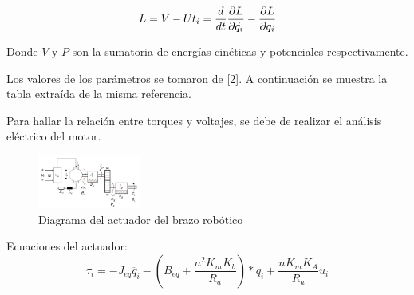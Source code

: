\documentclass[conference]{IEEEtran}
\begin{document}
\begin{equation}
L = V - U
t_i = \frac{d}{dt}\frac{\partial L }{\partial \dot{q_i}} - \frac{\partial L}{\partial q_i}\\
\end{equation}

Donde $V$ y $P$ son la sumatoria de energías cinéticas y potenciales respectivamente.



Los valores de los parámetros se tomaron de [2]. A continuación se muestra la tabla extraída de la misma referencia.


\onecolumn

Para hallar la relación entre torques y voltajes, se debe de realizar el análisis eléctrico del motor.
\begin{figure} [h]
    \centering
    \includegraphics[width=0.3\textwidth]{images/engine.png}
    \caption{Diagrama del actuador del brazo robótico}
\end{figure}

Ecuaciones del actuador:
$$\tau_i = -J_{eq}\ddot{q_i} - (B_{eq} + \frac{n^2K_m K_b}{R_a})*\dot{q_i} + \frac{n K_m K_A}{R_a} u_i$$\\
\end{document}
